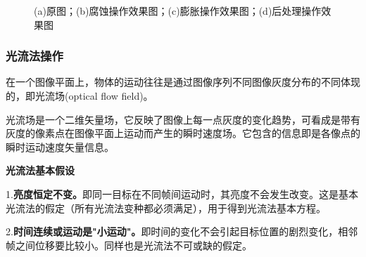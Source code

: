 \documentclass[11pt]{article}
\begin{document}
\begin{figure}[!h]
    \caption{(a)原图；(b)腐蚀操作效果图；(c)膨胀操作效果图；(d)后处理操作效果图}
\label{img:poss}
\end{figure}

\subsubsection{光流法操作}
在一个图像平面上，物体的运动往往是通过图像序列不同图像灰度分布的不同体现的，即光流场(optical flow field)。

光流场是一个二维矢量场，它反映了图像上每一点灰度的变化趋势，可看成是带有灰度的像素点在图像平面上运动而产生的瞬时速度场。它包含的信息即是各像点的瞬时运动速度矢量信息。

\textbf{光流法基本假设}

1.\textbf{亮度恒定不变。}即同一目标在不同帧间运动时，其亮度不会发生改变。这是基本光流法的假定（所有光流法变种都必须满足），用于得到光流法基本方程。

2.\textbf{时间连续或运动是"小运动"。}即时间的变化不会引起目标位置的剧烈变化，相邻帧之间位移要比较小。同样也是光流法不可或缺的假定。
\end{document}

